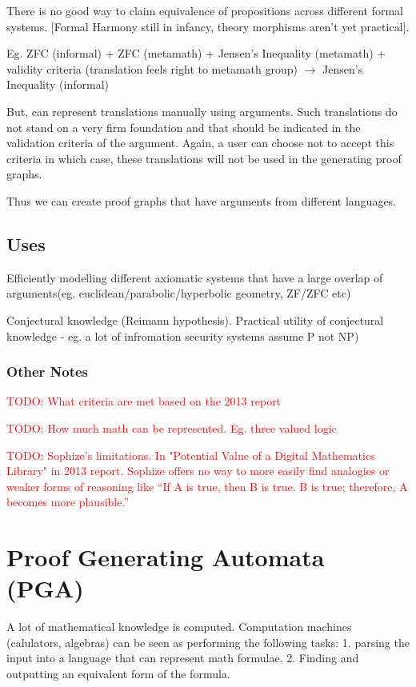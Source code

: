 \documentclass[a4paper]{article}
\newcommand\todo[1]{\textcolor{red}{TODO: #1}}
\begin{document}
There is no good way to claim equivalence of propositions across different formal systems. [Formal Harmony still in infancy, theory morphisms aren't yet practical].


Eg. ZFC (informal) + ZFC (metamath) + Jensen's Inequality (metamath) + validity criteria (translation feels right to metamath group) $\rightarrow$ 
Jensen's Inequality (informal)

But, can represent translations manually using arguments. Such translations do not stand on a very firm foundation and that should be indicated in the validation criteria of the argument. Again, a user can choose not to accept this criteria in which case, these translations will not be used in the generating proof graphs.


Thus we can create proof graphs that have arguments from different languages.

\subsection{Uses}
Efficiently modelling different axiomatic systems that have a large overlap of arguments(eg. euclidean/parabolic/hyperbolic geometry, ZF/ZFC etc)

Conjectural knowledge (Reimann hypothesis). 
Practical utility of conjectural knowledge - eg. a lot of infromation security systems assume  P not NP)

\subsubsection{Other Notes}
\todo{What criteria are met based on the 2013 report}

\todo{How much math can be represented. Eg. three valued logic}

\todo{Sophize's limitations. In "Potential Value of a
Digital Mathematics Library" in 2013 report. Sophize offers no way to more easily find analogies or weaker forms of reasoning like “If A is true, then B is true. B is true; therefore, A becomes more plausible.” }


\section{Proof Generating Automata (PGA)}
A lot of mathematical knowledge is computed. Computation machines (calulators, algebras) can be seen as performing the following tasks: 
1. parsing the input into a language that can represent math formulae. 
2. Finding and outputting an equivalent form of the formula.
\end{document}
